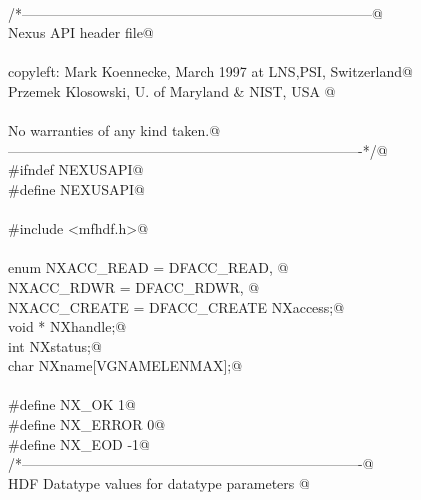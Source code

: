 \documentclass[12pt]{article}
\begin{document}
\begin{flushleft} \small
\begin{minipage}{\linewidth} \label{scrap35}
\vspace{-1ex}
\begin{list}{}{} \item
\mbox{}\verb@@\\
\mbox{}\verb@/*---------------------------------------------------------------------------@\\
\mbox{}\verb@                            Nexus API header file@\\
\mbox{}\verb@@\\
\mbox{}\verb@   copyleft: Mark Koennecke, March 1997 at LNS,PSI, Switzerland@\\
\mbox{}\verb@             Przemek Klosowski, U. of Maryland & NIST, USA       @\\
\mbox{}\verb@@\\
\mbox{}\verb@   No warranties of any kind taken.@\\
\mbox{}\verb@----------------------------------------------------------------------------*/@\\
\mbox{}\verb@#ifndef NEXUSAPI@\\
\mbox{}\verb@#define NEXUSAPI@\\
\mbox{}\verb@@\\
\mbox{}\verb@#include <mfhdf.h>@\\
\mbox{}\verb@@\\
\mbox{}\verb@typedef enum {NXACC_READ = DFACC_READ, @\\
\mbox{}\verb@              NXACC_RDWR = DFACC_RDWR, @\\
\mbox{}\verb@              NXACC_CREATE = DFACC_CREATE } NXaccess;@\\
\mbox{}\verb@typedef void *  NXhandle;@\\
\mbox{}\verb@typedef int  NXstatus;@\\
\mbox{}\verb@typedef char NXname[VGNAMELENMAX];@\\
\mbox{}\verb@@\\
\mbox{}\verb@#define NX_OK 1@\\
\mbox{}\verb@#define NX_ERROR 0@\\
\mbox{}\verb@#define NX_EOD -1@\\
\mbox{}\verb@/*-------------------------------------------------------------------------@\\
\mbox{}\verb@                HDF Datatype values for datatype parameters @\\

\end{list}
\end{minipage}
\end{flushleft}
\end{document}
